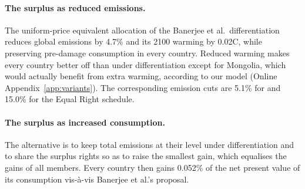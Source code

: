 \documentclass[12pt,english]{article}
\theoremstyle{remark}
\begin{document}
\paragraph{The surplus as reduced emissions.} The uniform-price equivalent allocation of the Banerjee et al.\ differentiation reduces global emissions by 4.7\% and its 2100 warming by 0.02\textdegree C, while preserving pre-damage consumption in every country. %
Reduced warming makes every country better off than under differentiation except for Mongolia, which would actually benefit from extra warming, according to our model %
(Online Appendix~\ref{app:variants}). The corresponding emission cuts are 5.1\% for \citet{wolfram_building_2025} and 15.0\% for the Equal Right schedule. %

\paragraph{The surplus as increased consumption.} The alternative is to keep total emissions at their level under differentiation and to share the surplus rights so as to raise the smallest gain, which equalises the gains of all members. Every country then gains 0.052\% of the net present value of its consumption vis-à-vis Banerjee et al.'s proposal. %

\end{document}
